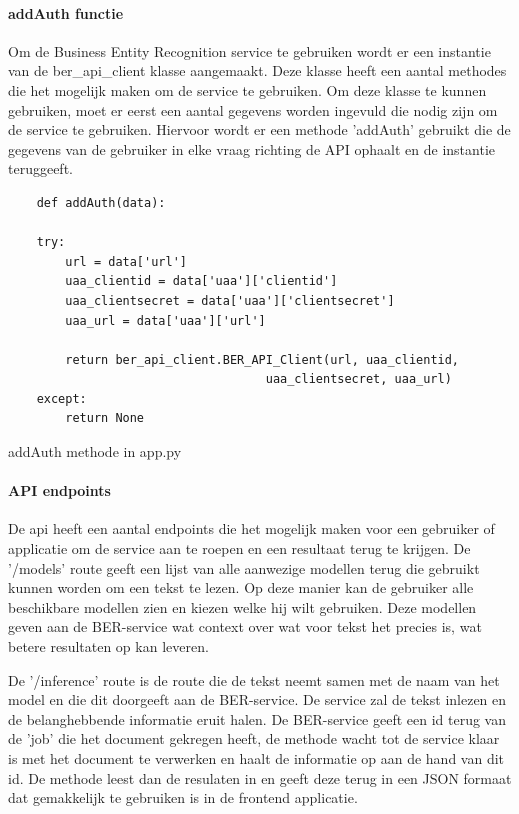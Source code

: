 \paragraph{addAuth functie}
Om de Business Entity Recognition service te gebruiken wordt er een instantie van de ber\_api\_client klasse aangemaakt. Deze klasse heeft een aantal methodes die het mogelijk maken om de service te gebruiken. Om deze klasse te kunnen gebruiken, moet er eerst een aantal gegevens worden ingevuld die nodig zijn om de service te gebruiken. Hiervoor wordt er een methode 'addAuth' gebruikt die de gegevens van de gebruiker in elke vraag richting de API ophaalt en de instantie teruggeeft.
\begin{listing}[H]
\begin{verbatim}
    def addAuth(data):

    try:
        url = data['url']
        uaa_clientid = data['uaa']['clientid']
        uaa_clientsecret = data['uaa']['clientsecret']
        uaa_url = data['uaa']['url']
    
        return ber_api_client.BER_API_Client(url, uaa_clientid, 
                                    uaa_clientsecret, uaa_url)
    except:
        return None
\end{verbatim}
\caption{addAuth methode in app.py}
\end{listing}

\paragraph{API endpoints}

De api heeft een aantal endpoints die het mogelijk maken voor een gebruiker of applicatie om de service aan te roepen en een resultaat terug te krijgen. De '/models' route geeft een lijst van alle aanwezige modellen terug die gebruikt kunnen worden om een tekst te lezen. Op deze manier kan de gebruiker alle beschikbare modellen zien en kiezen welke hij wilt gebruiken. Deze modellen geven aan de BER-service wat context over wat voor tekst het precies is, wat betere resultaten op kan leveren.

De '/inference' route is de route die de tekst neemt samen met de naam van het model en die dit doorgeeft aan de BER-service. De service zal de tekst inlezen en de belanghebbende informatie eruit halen. De BER-service geeft een id terug van de 'job' die het document gekregen heeft, de methode wacht tot de service klaar is met het document te verwerken en haalt de informatie op aan de hand van dit id. De methode leest dan de resulaten in en geeft deze terug in een JSON formaat dat gemakkelijk te gebruiken is in de frontend applicatie.

